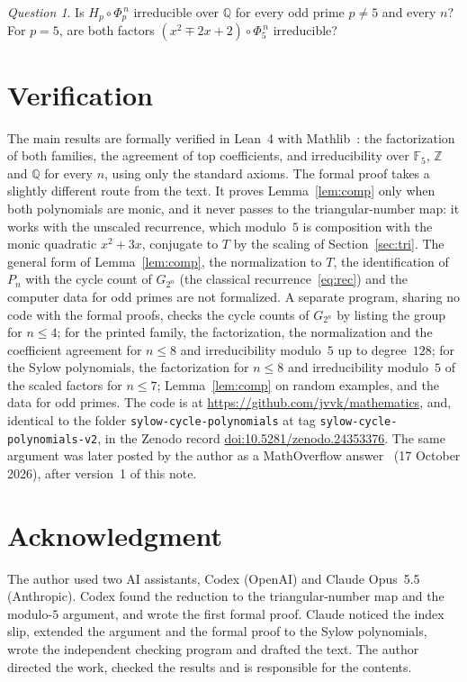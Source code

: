 \documentclass[11pt]{article}
\theoremstyle{remark}
\newtheorem*{question}{Question}
\newcommand{\F}{\mathbb{F}}
\begin{document}
\begin{question}
Is $H_p\circ\Phi_p^{\,n}$ irreducible over $\mathbb Q$ for every odd prime $p\ne5$ and every $n$? For $p=5$, are both factors $(x^2\mp2x+2)\circ\Phi_5^{\,n}$ irreducible?
\end{question}

\section*{Verification}

The main results are formally verified in Lean~4 with Mathlib~\cite{mathlib}: the factorization of both families, the agreement of top coefficients, and irreducibility over $\F_5$, $\mathbb Z$ and $\mathbb Q$ for every $n$, using only the standard axioms. The formal proof takes a slightly different route from the text. It proves Lemma~\ref{lem:comp} only when both polynomials are monic, and it never passes to the triangular-number map: it works with the unscaled recurrence, which modulo~$5$ is composition with the monic quadratic $x^2+3x$, conjugate to $T$ by the scaling of Section~\ref{sec:tri}. The general form of Lemma~\ref{lem:comp}, the normalization to $T$, the identification of $P_n$ with the cycle count of $G_{2^n}$ (the classical recurrence~\eqref{eq:rec}) and the computer data for odd primes are not formalized. A separate program, sharing no code with the formal proofs, checks the cycle counts of $G_{2^n}$ by listing the group for $n\le4$; for the printed family, the factorization, the normalization and the coefficient agreement for $n\le8$ and irreducibility modulo~$5$ up to degree~$128$; for the Sylow polynomials, the factorization for $n\le8$ and irreducibility modulo~$5$ of the scaled factors for $n\le7$; Lemma~\ref{lem:comp} on random examples, and the data for odd primes. The code is at \url{https://github.com/jvvk/mathematics}, and, identical to the folder \texttt{sylow-cycle-polynomials} at tag \texttt{sylow-cycle-polynomials-v2}, in the Zenodo record \href{https://doi.org/10.5281/zenodo.24353376}{doi:10.5281/zenodo.24353376}. The same argument was later posted by the author as a MathOverflow answer~\cite{Answer} (17 October 2026), after version~1 of this note.

\section*{Acknowledgment}

The author used two AI assistants, Codex (OpenAI) and Claude Opus~5.5 (Anthropic). Codex found the reduction to the triangular-number map and the modulo-$5$ argument, and wrote the first formal proof. Claude noticed the index slip, extended the argument and the formal proof to the Sylow polynomials, wrote the independent checking program and drafted the text. The author directed the work, checked the results and is responsible for the contents.
\end{document}
